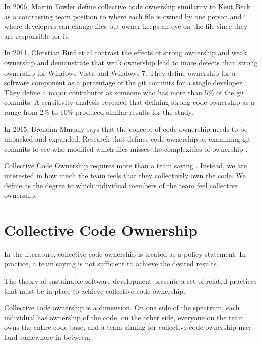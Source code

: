 In 2006, Martin Fowler define collective code ownership similarity to Kent Beck \cite{FowlerCodeOwnership} as a contrasting team position to  where each file is owned by one person and ` where developers can change files but owner keeps an eye on the file since they are responsible for it. 

In 2011, Christian Bird et al \cite{BirdDontTouchMyCode} contrast the effects of strong ownership and weak ownership and demonstrate that weak ownership lead to more defects than strong ownership for Windows Vista and Windows 7. They define ownership for a software component as a percentage of the git commits for a single developer. They define a major contributor as someone who has more than 5\% of the git commits. A sensitivity analysis revealed that defining strong code ownership as a range from 2\% to 10\% produced similar results for the study.

In 2015, Brendan Murphy says that the concept of code ownership needs to be unpacked and expanded. Research that defines code ownership as examining git commits to see who modified which files misses the complexities of ownership \cite{MurphyIEEESoftware}.

Collective Code Ownership requires more than a team saying . Instead, we are interested in how much the team feels that they collectively own the code. We define  as the degree to which individual members of the team feel collective ownership.  


\section{Collective Code Ownership}
\label{CollectiveCodeOwnership}

In the literature, collective code ownership is treated as a policy statement. In practice, a team saying  is not sufficient to achieve the desired results. 

The theory of sustainable software development presents a set of related practices that must be in place to achieve collective code ownership. 

Collective code ownership is a dimension. On one side of the spectrum, each individual has ownership of the code, on the other side, everyone on the team owns the entire code base, and a team aiming for collective code ownership may land somewhere in between. 


